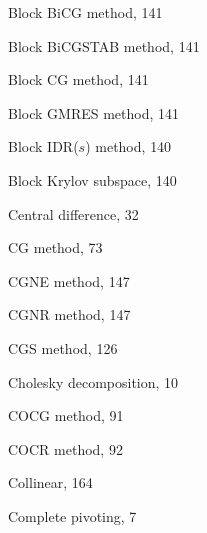\begin{description}
{Block BiCG method}, {141}\par

{Block BiCGSTAB method}, {141}\par

{Block CG method}, {141}\par

{Block GMRES method}, {141}\par

{Block IDR($s$) method}, {140}\par

{Block Krylov subspace}, {140}\par

\item[C]
{Central difference}, {32}\par

{CG method}, {73}\par

{CGNE method}, {147}\par

{CGNR method}, {147}\par

{CGS method}, {126}\par

{Cholesky decomposition}, {10}\par

{COCG method}, {91}\par

{COCR method}, {92}\par

{Collinear}, {164}\par

{Complete pivoting}, {7}\par


\end{description}
